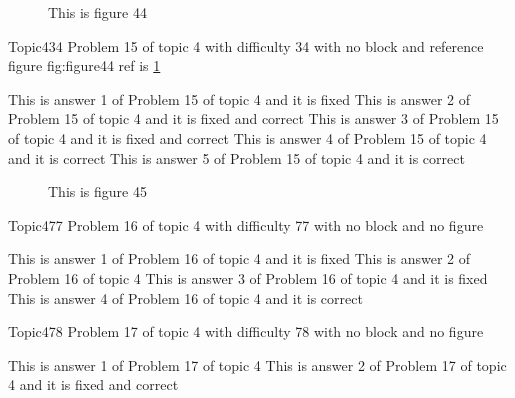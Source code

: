 \documentclass[master]{exam}
\begin{document}
\begin{figure}
	\begin{center}
		This is figure 44 
		\label{fig:figure44}
	\end{center}
\end{figure}

\begin{problem}{Topic4}{34}
	Problem 15 of topic 4 with difficulty 34 with no block and reference figure fig:figure44 ref is \ref{fig:figure44}
	\begin{answers}
		\answer[fixed] This is answer 1 of Problem 15 of topic 4 and it is fixed
		 This is answer 2 of Problem 15 of topic 4 and it is fixed and correct
		 This is answer 3 of Problem 15 of topic 4 and it is fixed and correct
		\answer[correct] This is answer 4 of Problem 15 of topic 4 and it is correct
		\answer[correct] This is answer 5 of Problem 15 of topic 4 and it is correct
	\end{answers}
\end{problem}



\begin{figure}
	\begin{center}
		This is figure 45 
		\label{fig:figure45}
	\end{center}
\end{figure}

\begin{problem}{Topic4}{77}
	Problem 16 of topic 4 with difficulty 77 with no block and no figure
	\begin{answers}
		\answer[fixed] This is answer 1 of Problem 16 of topic 4 and it is fixed
		\answer This is answer 2 of Problem 16 of topic 4 
		\answer[fixed] This is answer 3 of Problem 16 of topic 4 and it is fixed
		\answer[correct] This is answer 4 of Problem 16 of topic 4 and it is correct
	\end{answers}
\end{problem}

\begin{problem}{Topic4}{78}
	Problem 17 of topic 4 with difficulty 78 with no block and no figure
	\begin{answers}
		\answer This is answer 1 of Problem 17 of topic 4 
		 This is answer 2 of Problem 17 of topic 4 and it is fixed and correct
	\end{answers}
\end{problem}
\end{document}
